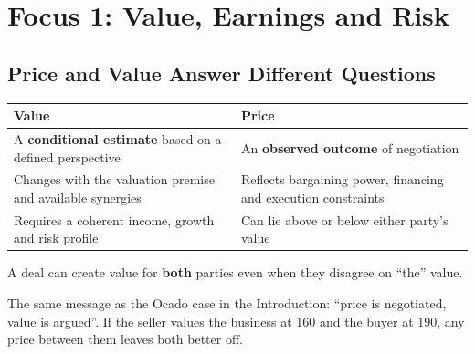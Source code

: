 \section{Focus 1: Value, Earnings and Risk}

\subsection{Price and Value Answer Different Questions}
\begin{center}
\small
\begin{tabular}{@{}p{7cm}p{7cm}@{}}
\toprule
\textbf{Value} & \textbf{Price}\\
\midrule
A \textbf{conditional estimate} based on a defined perspective & An \textbf{observed outcome} of negotiation\\
Changes with the valuation premise and available synergies & Reflects bargaining power, financing and execution constraints\\
Requires a coherent income, growth and risk profile & Can lie above or below either party's value\\
\bottomrule
\end{tabular}
\end{center}
\begin{keybox}
A deal can create value for \textbf{both} parties even when they disagree on ``the'' value.
\end{keybox}
\begin{addbox}
The same message as the Ocado case in the Introduction: ``price is negotiated, value is argued''. If the seller values the business at 160 and the buyer at 190, any price between them leaves both better off.
\end{addbox}

